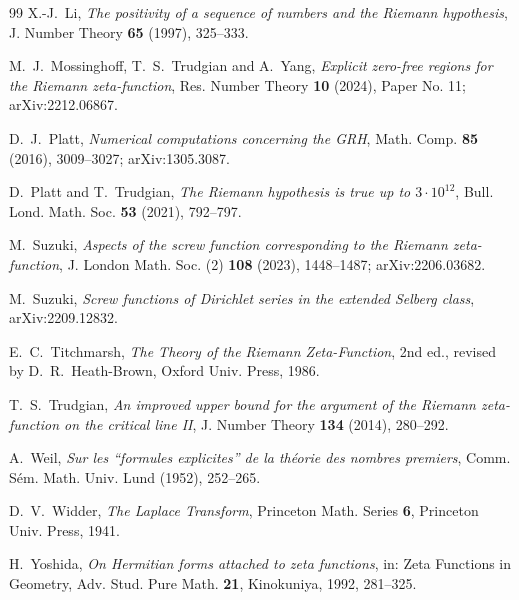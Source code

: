 \documentclass[11pt,reqno]{amsart}
\theoremstyle{plain}
\theoremstyle{definition}
\begin{document}
\begin{thebibliography}{99}
 X.-J.~Li,
\emph{The positivity of a sequence of numbers and the Riemann hypothesis},
J. Number Theory \textbf{65} (1997), 325--333.

 M.~J.~Mossinghoff, T.~S.~Trudgian and A.~Yang,
\emph{Explicit zero-free regions for the Riemann zeta-function},
Res. Number Theory \textbf{10} (2024), Paper No. 11; arXiv:2212.06867.

 D.~J.~Platt,
\emph{Numerical computations concerning the GRH},
Math. Comp. \textbf{85} (2016), 3009--3027; arXiv:1305.3087.

 D.~Platt and T.~Trudgian,
\emph{The Riemann hypothesis is true up to $3\cdot10^{12}$},
Bull. Lond. Math. Soc. \textbf{53} (2021), 792--797.

 M.~Suzuki,
\emph{Aspects of the screw function corresponding to the Riemann zeta-function},
J. London Math. Soc. (2) \textbf{108} (2023), 1448--1487; arXiv:2206.03682.

 M.~Suzuki,
\emph{Screw functions of Dirichlet series in the extended Selberg class}, arXiv:2209.12832.

 E.~C.~Titchmarsh,
\emph{The Theory of the Riemann Zeta-Function}, 2nd ed., revised by D.~R.~Heath-Brown,
Oxford Univ. Press, 1986.

 T.~S.~Trudgian,
\emph{An improved upper bound for the argument of the Riemann zeta-function on the critical line
II}, J. Number Theory \textbf{134} (2014), 280--292.

 A.~Weil,
\emph{Sur les ``formules explicites'' de la th\'eorie des nombres premiers},
Comm. S\'em. Math. Univ. Lund (1952), 252--265.

 D.~V.~Widder,
\emph{The Laplace Transform}, Princeton Math. Series \textbf{6}, Princeton Univ. Press, 1941.

 H.~Yoshida,
\emph{On Hermitian forms attached to zeta functions},
in: Zeta Functions in Geometry, Adv. Stud. Pure Math. \textbf{21}, Kinokuniya, 1992, 281--325.

\end{thebibliography}
\end{document}
